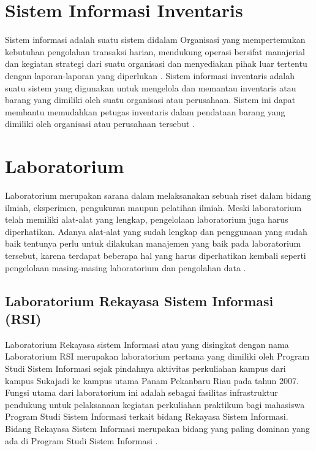 \section{Sistem Informasi Inventaris}
Sistem informasi adalah suatu sistem didalam Organisasi yang mempertemukan kebutuhan pengolahan transaksi harian, mendukung operasi bersifat manajerial dan kegiatan strategi dari suatu organisasi dan menyediakan pihak luar tertentu dengan laporan-laporan yang diperlukan \cite{laila2011sistem}. Sistem informasi inventaris adalah suatu sistem yang digunakan untuk mengelola dan memantau inventaris atau barang yang dimiliki oleh suatu organisasi atau perusahaan. Sistem ini dapat membantu memudahkan petugas inventaris dalam pendataan barang yang dimiliki oleh organisasi atau perusahaan tersebut \cite{Yanti2021SISTEMII}.
\section{Laboratorium}
Laboratorium merupakan sarana dalam melaksanakan sebuah riset dalam bidang ilmiah, eksperimen, pengukuran maupun pelatihan ilmiah. Meski laboratorium telah memiliki alat-alat yang lengkap, pengelolaan laboratorium juga harus diperhatikan. Adanya alat-alat yang sudah lengkap dan penggunaan yang sudah baik tentunya perlu untuk dilakukan manajemen yang baik pada laboratorium tersebut, karena terdapat beberapa hal yang harus diperhatikan kembali seperti pengelolaan masing-masing laboratorium dan pengolahan data \cite{sweden2022rancang}.

\subsection{Laboratorium Rekayasa Sistem Informasi (RSI)}
Laboratorium Rekayasa sistem Informasi atau yang disingkat dengan nama Laboratorium RSI merupakan laboratorium pertama yang dimiliki oleh Program Studi Sistem Informasi sejak pindahnya aktivitas perkuliahan kampus dari kampus Sukajadi ke kampus utama Panam Pekanbaru Riau pada tahun 2007. Fungsi utama dari laboratorium ini adalah sebagai fasilitas infrastruktur pendukung untuk pelaksanaan kegiatan perkuliahan praktikum bagi mahasiswa Program Studi Sistem Informasi terkait bidang Rekayasa Sistem Informasi. Bidang Rekayasa Sistem Informasi merupakan bidang yang paling dominan yang ada di Program Studi Sistem Informasi \cite{lab-si-website}.

